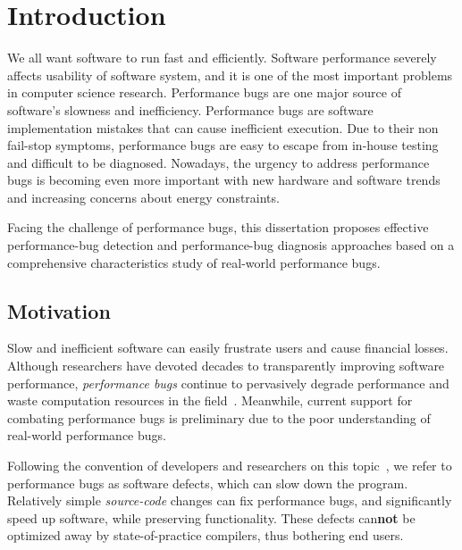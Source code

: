 \chapter[Introduction]{Introduction}
\label{chap:introduction}

We all want software to run fast and efficiently. 
Software performance severely affects usability of software system,
and it is one of the most important problems in computer science research. 
Performance bugs are one major source of software's slowness and inefficiency. 
Performance bugs are software implementation mistakes that can cause inefficient execution. 
Due to their non fail-stop symptoms, 
performance bugs are easy to escape from in-house testing and difficult to be diagnosed. 
Nowadays, the urgency to address performance bugs is becoming even more important 
with new hardware and software trends and increasing concerns about energy constraints. 

Facing the challenge of performance bugs, 
this dissertation proposes effective performance-bug detection 
and performance-bug diagnosis approaches based on a 
comprehensive characteristics study of real-world performance bugs.

\section{Motivation}
Slow and inefficient software can easily frustrate users and
cause financial losses.
Although researchers have devoted decades to
transparently improving software performance,
{\it performance bugs} continue to pervasively
degrade performance
and waste computation resources in the field~\citep{rily.perftest}.
Meanwhile, current support for combating performance bugs is preliminary due
to the poor understanding of real-world performance bugs.

Following the convention of developers and researchers 
on this topic~\citep{s2e,perf.fse10,rily.perftest,perfantipattern},
we refer to performance bugs
as software defects, which can slow down the program.
Relatively simple {\it source-code} changes can fix performance bugs, 
and significantly speed up software, 
while preserving functionality.
These defects can{\bf not} be optimized away by state-of-practice compilers,
thus bothering end users.


